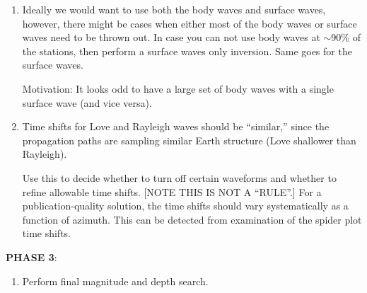 \begin{enumerate}
\begin{enumerate}


\item Ideally we would want to use both the body waves and surface waves, however, there might be cases when either most of the body waves or surface waves need to be thrown out. In case you can not use body waves at $\sim$90\% of the stations, then perform a surface waves only inversion. Same goes for the surface waves.

Motivation: It looks odd to have a large set of body waves with a single surface wave (and vice versa).


\item Time shifts for Love and Rayleigh waves should be ``similar,'' since the propagation paths are sampling similar Earth structure (Love shallower than Rayleigh). 

Use this to decide whether to turn off certain waveforms and whether to refine allowable time shifts. [NOTE THIS IS NOT A ``RULE''.] For a publication-quality solution, the time shifts should vary systematically as a function of azimuth. This can be detected from examination of the spider plot time shifts.
\end{enumerate}

\medskip\noindent
{\bf PHASE 3}:

\begin{enumerate}
\item Perform final magnitude and depth search.


\end{enumerate}


\end{enumerate}

%
%

